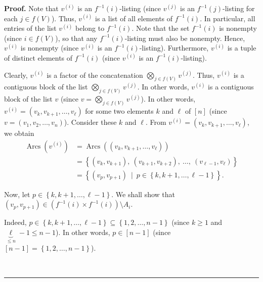 \documentclass[numbers=enddot,12pt,final,onecolumn,notitlepage]{scrartcl}%
\numberwithin{exer}{section}
\theoremstyle{definition}
\newenvironment{proof}[1][Proof]{\noindent\textbf{#1.} }{\ \rule{0.5em}{0.5em}}
\newenvironment{verlong}{}{}
\begin{document}
\begin{verlong}
\begin{proof}
Note that $v^{\left(  i\right)  }$ is an $f^{-1}\left(  i\right)  $-listing
(since $v^{\left(  j\right)  }$ is an $f^{-1}\left(  j\right)  $-listing for
each $j\in f\left(  V\right)  $). Thus, $v^{\left(  i\right)  }$ is a list of
all elements of $f^{-1}\left(  i\right)  $. In particular, all entries of the
list $v^{\left(  i\right)  }$ belong to $f^{-1}\left(  i\right)  $. Note that
the set $f^{-1}\left(  i\right)  $ is nonempty (since $i\in f\left(  V\right)
$), so that any $f^{-1}\left(  i\right)  $-listing must also be nonempty.
Hence, $v^{\left(  i\right)  }$ is nonempty (since $v^{\left(  i\right)  }$ is
an $f^{-1}\left(  i\right)  $-listing). Furthermore, $v^{\left(  i\right)  }$
is a tuple of distinct elements of $f^{-1}\left(  i\right)  $ (since
$v^{\left(  i\right)  }$ is an $f^{-1}\left(  i\right)  $-listing).

Clearly, $v^{\left(  i\right)  }$ is a factor of the concatenation
$\bigotimes\limits_{j\in f\left(  V\right)  }v^{\left(  j\right)  }$. Thus,
$v^{\left(  i\right)  }$ is a contiguous block of the list $\bigotimes
\limits_{j\in f\left(  V\right)  }v^{\left(  j\right)  }$. In other words,
$v^{\left(  i\right)  }$ is a contiguous block of the list $v$ (since
$v=\bigotimes\limits_{j\in f\left(  V\right)  }v^{\left(  j\right)  }$). In
other words, $v^{\left(  i\right)  }=\left(  v_{k},v_{k+1},\ldots,v_{\ell
}\right)  $ for some two elements $k$ and $\ell$ of $\left[  n\right]  $
(since $v=\left(  v_{1},v_{2},\ldots,v_{n}\right)  $). Consider these $k$ and
$\ell$. From $v^{\left(  i\right)  }=\left(  v_{k},v_{k+1},\ldots,v_{\ell
}\right)  $, we obtain%
\begin{align}
\operatorname*{Arcs}\left(  v^{\left(  i\right)  }\right)   &
=\operatorname*{Arcs}\left(  \left(  v_{k},v_{k+1},\ldots,v_{\ell}\right)
\right) \nonumber\\
&  =\left\{  \left(  v_{k},v_{k+1}\right)  ,\ \left(  v_{k+1},v_{k+2}\right)
,\ \ldots,\ \left(  v_{\ell-1},v_{\ell}\right)  \right\} \nonumber\\
&  =\left\{  \left(  v_{p},v_{p+1}\right)  \ \mid\ p\in\left\{  k,k+1,\ldots
,\ell-1\right\}  \right\}  . \label{pf.lem.friendlies-by-f.c4.Arcs}%
\end{align}


Now, let $p\in\left\{  k,k+1,\ldots,\ell-1\right\}  $. We shall show that
$\left(  v_{p},v_{p+1}\right)  \in\left(  f^{-1}\left(  i\right)  \times
f^{-1}\left(  i\right)  \right)  \setminus A_{i}$.

Indeed, $p\in\left\{  k,k+1,\ldots,\ell-1\right\}  \subseteq\left\{
1,2,\ldots,n-1\right\}  $ (since $k\geq1$ and $\underbrace{\ell}_{\leq
n}-1\leq n-1$). In other words, $p\in\left[  n-1\right]  $ (since $\left[
n-1\right]  =\left\{  1,2,\ldots,n-1\right\}  $).


\end{proof}
\end{verlong}
\end{document}

